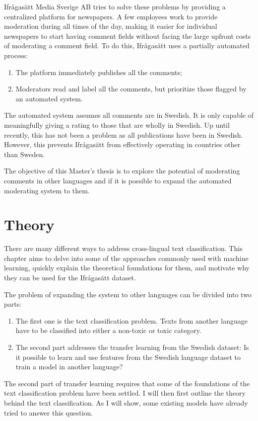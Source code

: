 \documentclass[nofilelist]{cslthse-msc}
\begin{document}
Ifrågasätt Media Sverige AB tries to solve these problems by providing a centralized platform for newspapers. A few employees work to provide moderation during all times of the day, making it easier for individual newspapers to start having comment fields without facing the large upfront costs of moderating a comment field. To do this, Ifrågasätt uses a partially automated process:
\begin{enumerate}
    \item The platform immediately publishes all the comments;
    \item  Moderators read and label all the comments, but prioritize those flagged by an automated system.
\end{enumerate}

The automated system assumes all comments are in Swedish. It is only capable of meaningfully giving a rating to those that are wholly in Swedish. Up until recently, this has not been a problem as all publications have been in Swedish. However, this prevents Ifrågasätt from effectively operating in countries other than Sweden. 

The objective of this Master's thesis is to explore the potential of moderating comments in other languages and if it is possible to expand the automated moderating system to them.


\chapter{Theory}
There are many different ways to address cross-lingual text classification. This chapter aims to delve into some of the approaches commonly used with machine learning, quickly explain the theoretical foundations for them, and motivate why they can be used for the Ifrågasätt dataset.

The problem of expanding the system to other languages can be divided into two parts:
\begin{enumerate}
    \item The first one is the text classification problem. Texts from another language have to be classified into either a non-toxic or toxic category. 
    \item The second part addresses the transfer learning from the Swedish dataset: Is it possible to learn and use features from the Swedish language dataset to train a model in another language? 
\end{enumerate}

The second part of transfer learning requires that some of the foundations of the text classification problem have been settled. I will then first outline the theory behind the text classification. As I will show, some existing models have already tried to answer this question. 
\end{document}
